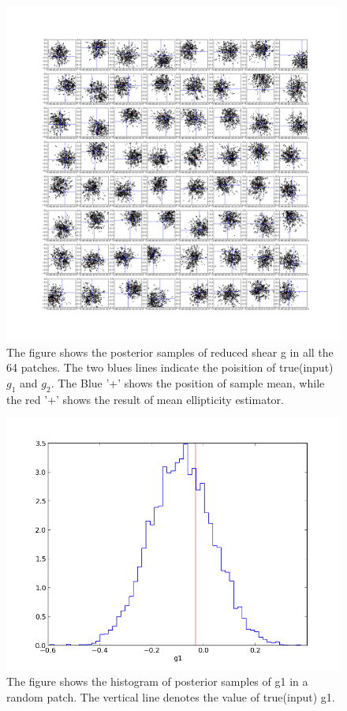 \documentclass[useAMS,usenatbib]{mn2e}
\begin{document}
\begin{figure}
\end{figure}
\begin{figure}
\includegraphics[scale=0.15]{fig/test10}

\caption{The figure shows the posterior samples of reduced shear g
in all the 64 patches. The two blues lines indicate the poisition of
true(input) $g_{1}$ and $g_{2}$. The Blue '+' shows the position
of sample mean, while the red '+' shows the result of mean ellipticity
estimator.}
\end{figure}

\begin{figure}
\end{figure}

\begin{figure}
\includegraphics[scale=0.48]{fig/g1hist}

\caption{The figure shows the histogram of posterior samples of g1 in a random patch. The vertical line denotes the value of true(input) g1. }
\end{figure}
\end{document}
